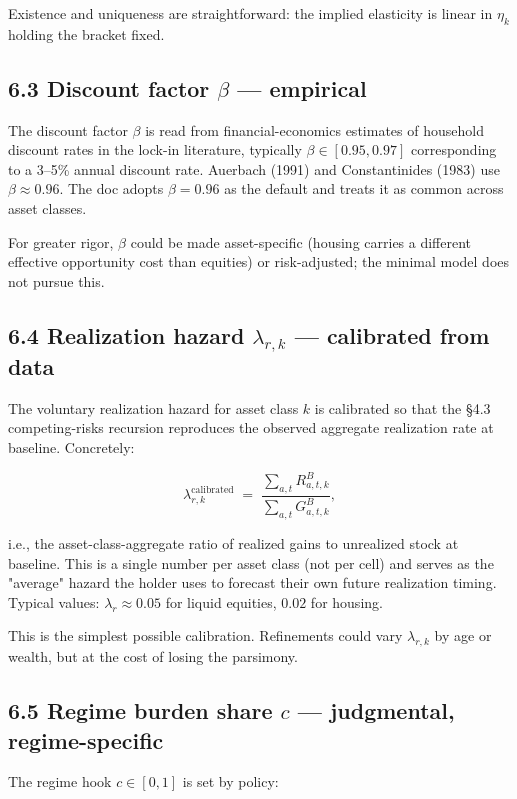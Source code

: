 \documentclass[11pt]{article}
\begin{document}
Existence and uniqueness are straightforward: the implied elasticity is linear in $\eta_k$ holding the bracket fixed.

\subsection*{6.3 Discount factor $\beta$ — empirical}

The discount factor $\beta$ is read from financial-economics estimates of household discount rates in the lock-in literature, typically $\beta \in
[0.95, 0.97]$ corresponding to a 3–5\% annual discount rate. Auerbach (1991) and Constantinides (1983) use $\beta \approx 0.96$. The doc adopts $\beta = 0.96$ as the default and treats it as common across asset classes.

For greater rigor, $\beta$ could be made asset-specific (housing carries a different effective opportunity cost than equities) or risk-adjusted; the minimal model does not pursue this.

\subsection*{6.4 Realization hazard $\lambda_{r,k}$ — calibrated from data}

The voluntary realization hazard for asset class $k$ is calibrated so that the §4.3 competing-risks recursion reproduces the observed aggregate realization rate at baseline. Concretely:

\[
\lambda_{r,k}^{\text{calibrated}}
\;=\;
\frac{\sum_{a,t} R^B_{a,t,k}}{\sum_{a,t} G^B_{a,t,k}},
\]

i.e., the asset-class-aggregate ratio of realized gains to unrealized stock at baseline. This is a single number per asset class (not per cell) and serves as the "average" hazard the holder uses to forecast their own future realization timing. Typical values: $\lambda_r \approx 0.05$ for liquid equities, $0.02$ for housing.

This is the simplest possible calibration. Refinements could vary $\lambda_{r,k}$ by age or wealth, but at the cost of losing the parsimony.

\subsection*{6.5 Regime burden share $c$ — judgmental, regime-specific}

The regime hook $c \in [0, 1]$ is set by policy:
\end{document}

